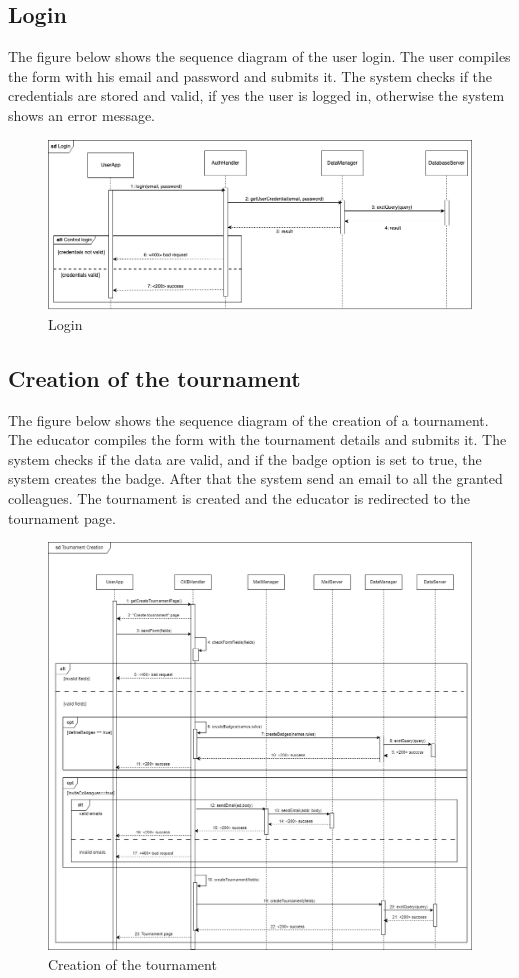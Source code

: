 \subsection{Login}
The figure below shows the sequence diagram of the user login. The user compiles the form with his email and password and submits it. 
The system checks if the credentials are stored and valid, if yes the user is logged in, otherwise the system shows an error message.
\begin{figure}[H]
    \centering
    \includegraphics[width=1\textwidth]{images/seq_diagrams/Login_DD.png}
    \caption{Login}
\end{figure}

\subsection{Creation of the tournament}
The figure below shows the sequence diagram of the creation of a tournament. The educator compiles the form
 with the tournament details and submits it. The system checks if the data are valid, and if the badge option is set to true, the system creates the badge.
 After that the system send an email to all the granted colleagues. The tournament is created and the educator is redirected to the tournament page.

 \begin{figure}[H]
    \centering
    \includegraphics[width=1\textwidth]{images/seq_diagrams/tournament_creation_DD.png}
    \caption{Creation of the tournament}
\end{figure}

